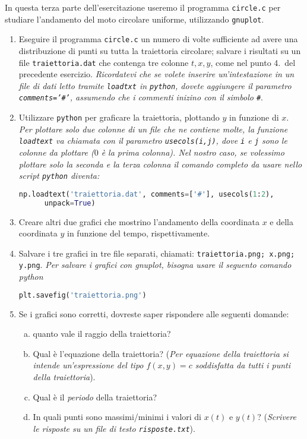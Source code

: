 \documentclass[11pt]{article}
\begin{document}
In questa terza parte dell'esercitazione useremo il programma \texttt{circle.c} per
studiare l'andamento del moto circolare uniforme, utilizzando \texttt{gnuplot}.
\begin{enumerate}
\item Eseguire il programma \texttt{circle.c} un numero di volte sufficiente ad avere una distribuzione di punti su tutta la traiettoria circolare; salvare
  i risultati su un file \texttt{traiettoria.dat} che contenga tre colonne $t,x,y$, come nel punto 4.\ del precedente esercizio.
  {\em Ricordatevi che se volete inserire un'intestazione in un file di dati letto tramite \texttt{loadtxt} in \texttt{python}, dovete aggiungere il parametro \texttt{comments='\#'}, assumendo che i commenti inizino con il simbolo \texttt{\#}}.

\item Utilizzare \texttt{python} per graficare la traiettoria, plottando $y$ in funzione di $x$.
  {\em Per plottare solo due colonne di un file che ne contiene molte, la funzione \texttt{loadtext} va chiamata 
  con il parametro \texttt{usecols(i,j)}, dove \lstinline{i} e \lstinline{j} sono le colonne da plottare ($0$ è la prima colonna). Nel nostro caso, se volessimo plottare solo la seconda e la terza colonna il comando completo da usare nello script \texttt{python} diventa:\/} \\
  \begin{lstlisting}[language=Python,numbers=none]
  np.loadtext('traiettoria.dat', comments=['#'], usecols(1:2),
      unpack=True)
\end{lstlisting}
\item 
  Creare altri due grafici che mostrino l'andamento della coordinata $x$ e della coordinata $y$ in funzione del tempo, rispettivamente.
\item Salvare i tre grafici in tre file separati, chiamati: \texttt{traiettoria.png; x.png; y.png}.
  {\em Per salvare i grafici con gnuplot, bisogna usare il seguento comando python\/}
\begin{lstlisting}[language=Python,numbers=none]
     plt.savefig('traiettoria.png')
\end{lstlisting}
\item Se i grafici sono corretti, dovreste saper rispondere alle seguenti domande: 
\begin{enumerate}[(a)]
\item quanto vale il raggio della traiettoria? 
\item Qual \`e l'equazione della traiettoria? ({\em Per equazione della
  traiettoria si intende un'espressione del tipo $f(x,y)=c$ soddisfatta da tutti i punti della traiettoria\/}). 
\item Qual \`e il {\em periodo\/} della traiettoria? 
\item In quali punti sono massimi/minimi i valori di $x(t)$ e $y(t)$? ({\em Scrivere le risposte su un file di testo \texttt{risposte.txt}\/}).
\end{enumerate}
\end{enumerate}
\end{document}
